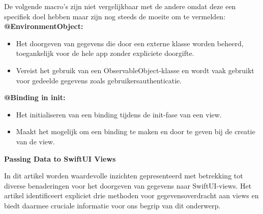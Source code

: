 De volgende macro's zijn niet vergelijkbaar met de andere omdat deze een specifiek doel hebben maar zijn nog steeds de moeite om te vermelden:
\newline\textbf{@EnvironmentObject:}
\begin{itemize}
    \item {Het doorgeven van gegevens die door een externe klasse worden beheerd, toegankelijk voor de hele app zonder expliciete doorgifte.}
    \item {Vereist het gebruik van een ObservableObject-klasse en wordt vaak gebruikt voor gedeelde gegevens zoals gebruikersauthenticatie.}
\end{itemize}
\textbf{@Binding in init:}
\begin{itemize}
    \item {Het initialiseren van een binding tijdens de init-fase van een view.}
    \item {Maakt het mogelijk om een binding te maken en door te geven bij de creatie van de view.}
\end{itemize}


\textbf{Passing Data to SwiftUI Views~\autocite{SwiftDevJournal}}

In dit artikel worden waardevolle inzichten gepresenteerd met betrekking tot diverse benaderingen voor het doorgeven van gegevens naar SwiftUI-views. Het artikel identificeert expliciet drie methoden voor gegevensoverdracht aan views en biedt daarmee cruciale informatie voor ons begrip van dit onderwerp.

